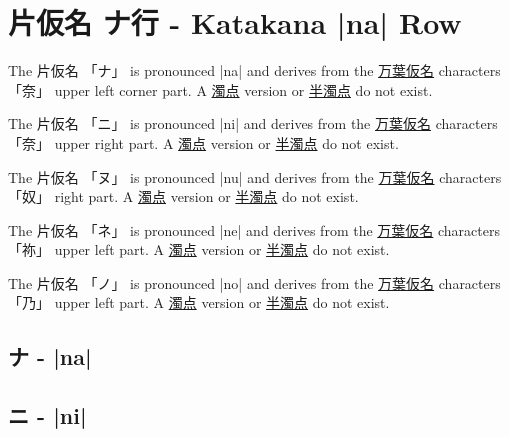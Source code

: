 \section{片仮名  ナ行 - Katakana |na| Row} \label{sec:KatakanaNaRow}


 The  片仮名 {「ナ」} is pronounced  |na| and  derives from the
\hyperref[sec:Manyogana]{万葉仮名} characters {「奈」} upper left corner part.
A \hyperref[sec:Dakuten]{濁点} version  or \hyperref[sec:Handakuten]{半濁点} do
not exist.

 The  片仮名 {「ニ」} is pronounced  |ni| and  derives from the
\hyperref[sec:Manyogana]{万葉仮名} characters {「奈」} upper right part.
A \hyperref[sec:Dakuten]{濁点} version  or \hyperref[sec:Handakuten]{半濁点} do
not exist.

 The  片仮名 {「ヌ」} is pronounced  |nu| and  derives from the
\hyperref[sec:Manyogana]{万葉仮名} characters {「奴」} right part.
A \hyperref[sec:Dakuten]{濁点} version  or \hyperref[sec:Handakuten]{半濁点} do
not exist.


\newpage

 The  片仮名 {「ネ」} is pronounced  |ne| and  derives from the
\hyperref[sec:Manyogana]{万葉仮名} characters {「祢」} upper left  part.
A \hyperref[sec:Dakuten]{濁点} version  or \hyperref[sec:Handakuten]{半濁点} do
not exist.

 The  片仮名 {「ノ」} is pronounced  |no| and  derives from the
\hyperref[sec:Manyogana]{万葉仮名} characters {「乃」} upper left part.
A \hyperref[sec:Dakuten]{濁点} version  or \hyperref[sec:Handakuten]{半濁点} do
not exist.

 \newpage

\subsection{ナ - |na|} \label{sec:KatakanaNa}

 

\subsection{ニ - |ni|} \label{sec:KatakanaNi}

